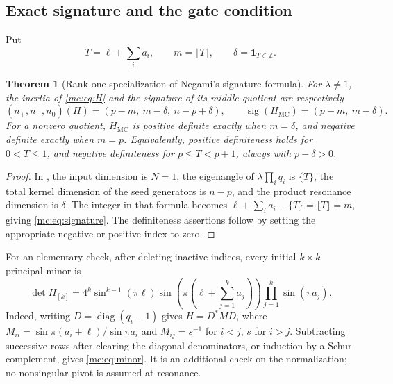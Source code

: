 \documentclass[11pt,a4paper]{article}
\newtheorem{theorem}{Theorem}[section]
\theoremstyle{remark}\newtheorem{remark}[theorem]{Remark}
\newcommand{\MC}{\operatorname{MC}}
\begin{document}
\subsection{Exact signature and the gate condition}
Put
\[
 T=\ell+\sum_i a_i,\qquad m=\lfloor T\rfloor,
 \qquad \delta=\mathbf1_{T\in\mathbb Z}.
\]
\begin{theorem}[Rank-one specialization of Negami's signature formula]
For $\lambda\ne1$, the inertia of \eqref{mc:eq:H} and the signature of its
middle quotient are respectively
\begin{equation}\label{mc:eq:signature}
 (n_+,n_-,n_0)(H)=(p-m,\ m-\delta,\ n-p+\delta),
 \qquad \operatorname{sig}(H_{\MC})=(p-m,\ m-\delta).
\end{equation}
For a nonzero quotient, $H_{\MC}$ is positive definite exactly when
$m=\delta$, and negative definite exactly when $m=p$.
Equivalently, positive definiteness holds for $0<T\le1$, and negative
definiteness for $p\le T<p+1$, always with $p-\delta>0$.
\end{theorem}
\begin{proof}
In \cite[Theorem 1.1]{NegamiSignature}, the input dimension is $N=1$,
the eigenangle of $\lambda\prod_iq_i$ is $\{T\}$, the total kernel
dimension of the seed generators is $n-p$, and the product resonance
dimension is $\delta$. The integer in that formula becomes
$\ell+\sum_i a_i-\{T\}=\lfloor T\rfloor=m$, giving
\eqref{mc:eq:signature}. The definiteness assertions follow by setting the
appropriate negative or positive index to zero.
\end{proof}

For an elementary check, after deleting inactive indices, every initial
$k\times k$ principal minor is
\begin{equation}\label{mc:eq:minor}
 \det H_{[k]}=4^k\sin^{k-1}(\pi\ell)
 \sin\!\left(\pi\left(\ell+\sum_{j=1}^k a_j\right)\right)
 \prod_{j=1}^k\sin(\pi a_j).
\end{equation}
Indeed, writing $D=\operatorname{diag}(q_i-1)$ gives $H=D^*MD$,
where $M_{ii}=\sin\pi(a_i+\ell)/\sin\pi a_i$ and
$M_{ij}=s^{-1}$ for $i<j$, $s$ for $i>j$. Subtracting successive
rows after clearing the diagonal denominators, or induction by a Schur
complement, gives \eqref{mc:eq:minor}. It is an additional check on the
normalization; no nonsingular pivot is assumed at resonance.
\end{document}
